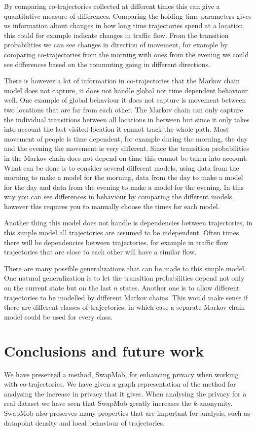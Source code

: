 \documentclass[12pt]{article}
\theoremstyle{definition}
\begin{document}
By comparing co-trajectories collected at different times this can
give a quantitative measure of differences. Comparing the holding time
parameters gives us information about changes in how long time
trajectories spend at a location, this could for example indicate
changes in traffic flow. From the transition probabilities we can see
changes in direction of movement, for example by comparing
co-trajectories from the morning with ones from the evening we could
see differences based on the commuting going in different directions.

There is however a lot of information in co-trajectories that the
Markov chain model does not capture, it does not handle global nor
time dependent behaviour well. One example of global behaviour it does
not capture is movement between two locations that are far from each
other. The Markov chain can only capture the individual transitions
between all locations in between but since it only takes into account
the last visited location it cannot track the whole path. Most
movement of people is time dependent, for example during the morning,
the day and the evening the movement is very different. Since the
transition probabilities in the Markov chain does not depend on time
this cannot be taken into account. What can be done is to consider
several different models, using data from the morning to make a model
for the morning, data from the day to make a model for the day and
data from the evening to make a model for the evening. In this way you
can see differences in behaviour by comparing the different models,
however this requires you to manually choose the times for each model.

Another thing this model does not handle is dependencies between
trajectories, in this simple model all trajectories are assumed to be
independent. Often times there will be dependencies between
trajectories, for example in traffic flow trajectories that are close
to each other will have a similar flow.

There are many possible generalizations that can be made to this
simple model. One natural generalization is to let the transition
probabilities depend not only on the current state but on the last
\(n\) states. Another one is to allow different trajectories to be
modelled by different Markov chains. This would make sense if there
are different classes of trajectories, in which case a separate Markov
chain model could be used for every class.

\section{Conclusions and future work}
We have presented a method, SwapMob, for enhancing privacy when
working with co-trajectories. We have given a graph representation of
the method for analysing the increase in privacy that it gives. When
analysing the privacy for a real dataset we have seen that SwapMob
greatly increases the \(k\)-anonymity. SwapMob also preserves many
properties that are important for analysis, such as datapoint density
and local behaviour of trajectories.
\end{document}
